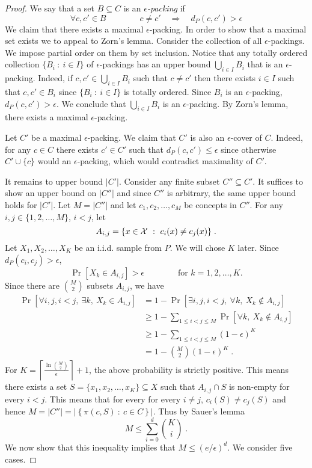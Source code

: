 \begin{proof}
We say that a set $B \subseteq C$ is an \emph{$\epsilon$-packing} if
$$
\forall c,c' \in B \qquad \qquad c \neq c' \quad \Longrightarrow \quad d_P(c,c') > \epsilon
$$
We claim that there exists a maximal $\epsilon$-packing. In order to show that a
maximal set exists we to appeal to Zorn's lemma. Consider the collection of all
$\epsilon$-packings. We impose partial order on them by set inclusion. Notice
that any totally ordered collection $\{ B_i ~:~ i \in I \}$ of
$\epsilon$-packings has an upper bound $\bigcup_{i \in I} B_i$ that is an
$\epsilon$-packing. Indeed, if $c,c' \in \bigcup_{i \in I} B_i$ such that $c
\neq c'$ then there exists $i \in I$ such that $c,c' \in B_i$ since $\{ B_i ~:~
i \in I \}$ is totally ordered. Since $B_i$ is an $\epsilon$-packing, $d_P(c,c') >
\epsilon$. We conclude that $\bigcup_{i \in I} B_i$ is an $\epsilon$-packing. By
Zorn's lemma, there exists a maximal $\epsilon$-packing.

Let $C'$ be a maximal $\epsilon$-packing. We claim that $C'$ is also an
$\epsilon$-cover of $C$. Indeed, for any $c \in C$ there exists $c' \in C'$ such
that $d_P(c,c') \le \epsilon$ since otherwise $C' \cup \{c\}$ would an
$\epsilon$-packing, which would contradict maximality of $C'$.

It remains to upper bound $|C'|$. Consider any finite subset $C'' \subseteq C'$.
It suffices to show an upper bound on $|C''|$ and since $C''$ is arbitrary, the
same upper bound holds for $|C'|$. Let $M = |C''|$ and let $c_1, c_2, \dots,
c_M$ be concepts in $C''$. For any $i,j \in \{1,2,\dots,M\}$, $i < j$, let
$$
A_{i,j} = \{ x \in \mathcal{X} ~:~ c_i(x) \neq c_j(x) \} \; .
$$
Let $X_1, X_2, \dots, X_K$ be an i.i.d. sample from $P$. We will chose $K$ later.
Since $d_P(c_i, c_j) > \epsilon$,
$$
\Pr[X_k \in A_{i,j}] > \epsilon \qquad \qquad \text{for $k=1,2,\dots,K$}.
$$
Since there are $\binom{M}{2}$ subsets $A_{i,j}$, we have
\begin{align*}
\Pr\left[\forall i,j, i < j, \ \exists k, \ X_k \in A_{i,j} \right]
& = 1 - \Pr\left[\exists i,j, i < j, \ \forall k, \ X_k \not \in A_{i,j} \right] \\
& \ge 1 - \sum_{1 \le i < j \le M} \Pr\left[\forall k, \ X_k \not \in A_{i,j} \right] \\
& \ge 1 - \sum_{1 \le i < j \le M} (1 - \epsilon)^K \\
& = 1 - \binom{M}{2} (1 - \epsilon)^K \; .
\end{align*}
For $K = \left\lceil \frac{\ln \binom{M}{2}}{\epsilon} \right\rceil +
1$, the above probability is strictly positive. This means there exists a set $S =
\{x_1, x_2, \dots, x_K\} \subseteq X$ such that $A_{i,j} \cap S$ is non-empty
for every $i < j$. This means that for every for every $i \neq j$, $c_i(S) \neq
c_j(S)$ and hence $M = |C''| = \left| \left\{ \pi(c, S) ~:~ c \in C \right\} \right|$.
Thus by Sauer's lemma
$$
M \le \sum_{i=0}^d \binom{K}{i} \; .
$$
We now show that this inequality implies that $M \le (e/\epsilon)^d$. We consider five cases.


\end{proof}
